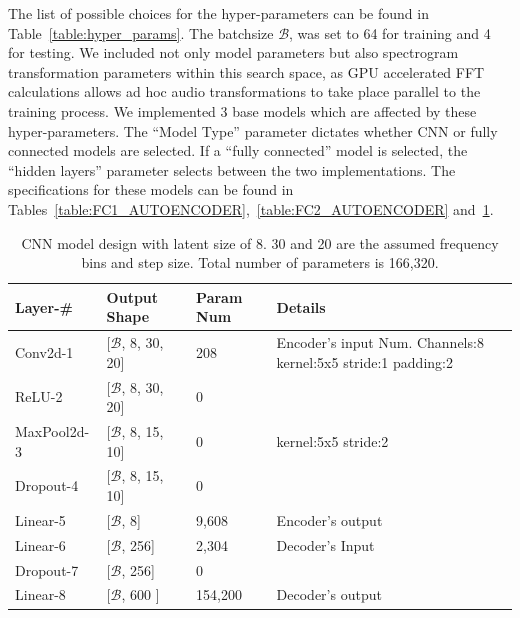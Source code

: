 \documentclass[\main/thesis.tex]{subfiles}
\begin{document}
The list of possible choices for the hyper-parameters can be found in Table~\ref{table:hyper_params}. The batchsize $\mathcal{B}$, was set to 64 for training and 4 for testing. We included not only model parameters but also spectrogram transformation parameters within this search space, as GPU accelerated FFT calculations allows ad hoc audio transformations to take place parallel to the training process. We implemented 3 base models which are affected by these hyper-parameters. The \enquote{Model Type} parameter dictates whether CNN or fully connected models are selected. If a \enquote{fully connected} model is selected, the \enquote{hidden layers} parameter selects between the two implementations. The specifications for these models can be found in Tables~\ref{table:FC1_AUTOENCODER},~\ref{table:FC2_AUTOENCODER} and~\ref{table:CNNAUTOENCODER}.

\begin{table}[]
\begin{tabular}{|p{28mm}|p{25mm}|p{23mm}|p{50mm}|}
\hline
Layer-\# & Output Shape & Param Num & Details  \\ \hline
Conv2d-1 & [$\mathcal{B}$, 8, 30, 20] &   208 & Encoder's input \newline
Num. Channels:8\newline
kernel:5x5\newline                  
stride:1\newline    
padding:2 \\ \hline
ReLU-2 & [$\mathcal{B}$, 8, 30, 20] &   0 & \\  \hline
MaxPool2d-3 & [$\mathcal{B}$, 8, 15, 10] & 0 &  kernel:5x5 \newline
stride:2 \\ \hline
Dropout-4 & [$\mathcal{B}$, 8, 15, 10] & 0 &  \\ \hline
Linear-5 & [$\mathcal{B}$, 8] & 9,608 & Encoder's output \\ \hline
Linear-6 & [$\mathcal{B}$, 256] & 2,304 & Decoder's Input \\ \hline
Dropout-7 & [$\mathcal{B}$, 256] & 0 &  \\ \hline
Linear-8 & [$\mathcal{B}$, 600 ] &  154,200& Decoder's output\\ \hline
\end{tabular}
\caption{CNN model design with latent size of 8. 30 and 20 are the assumed frequency bins and step size. Total number of parameters is 166,320. }
\label{table:CNNAUTOENCODER}
\end{table}
\end{document}
